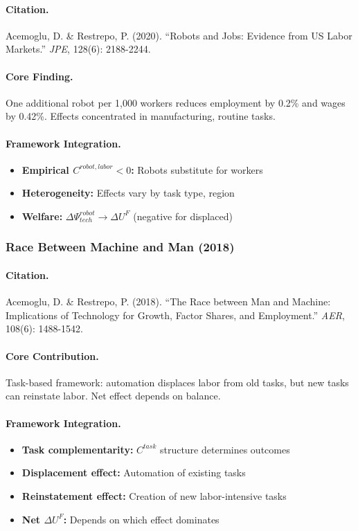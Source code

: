 \documentclass[12pt,a4paper]{article}
\begin{document}
\paragraph{Citation.}
Acemoglu, D. \& Restrepo, P. (2020).
``Robots and Jobs: Evidence from US Labor Markets.''
\emph{JPE}, 128(6): 2188-2244.

\paragraph{Core Finding.}
One additional robot per 1,000 workers reduces employment by 0.2\%
and wages by 0.42\%. Effects concentrated in manufacturing, routine tasks.

\paragraph{Framework Integration.}
\begin{itemize}
  \item \textbf{Empirical $C^{robot,labor} < 0$:} Robots substitute for workers
  \item \textbf{Heterogeneity:} Effects vary by task type, region
  \item \textbf{Welfare:} $\Delta\Psi_{tech}^{robot} \to \Delta U^F$ (negative for displaced)
\end{itemize}

\subsubsection{Race Between Machine and Man (2018)}

\paragraph{Citation.}
Acemoglu, D. \& Restrepo, P. (2018).
``The Race between Man and Machine: Implications of Technology for Growth,
Factor Shares, and Employment.'' \emph{AER}, 108(6): 1488-1542.

\paragraph{Core Contribution.}
Task-based framework: automation displaces labor from old tasks,
but new tasks can reinstate labor. Net effect depends on balance.

\paragraph{Framework Integration.}
\begin{itemize}
  \item \textbf{Task complementarity:} $C^{task}$ structure determines outcomes
  \item \textbf{Displacement effect:} Automation of existing tasks
  \item \textbf{Reinstatement effect:} Creation of new labor-intensive tasks
  \item \textbf{Net $\Delta U^F$:} Depends on which effect dominates
\end{itemize}
\end{document}
